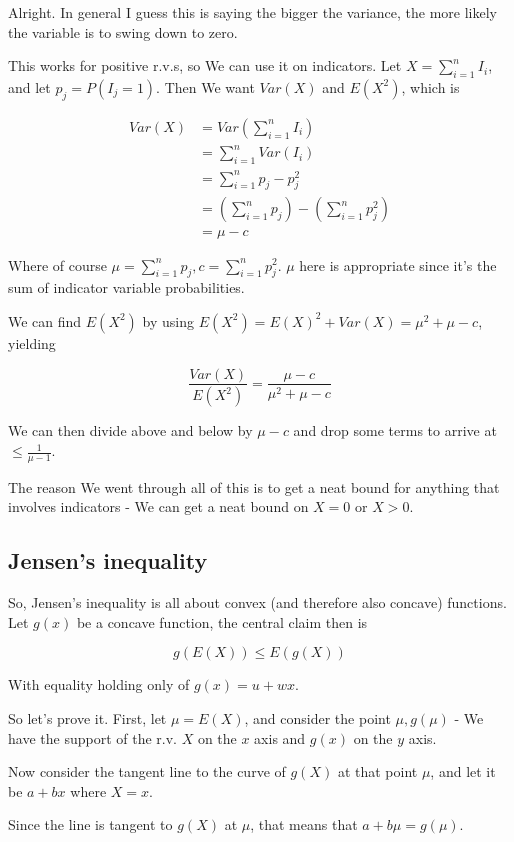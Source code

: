 \documentclass{article}
\begin{document}
		Alright. In general I guess this is saying the bigger the variance, the more likely the variable is to swing down to zero. 
		
		This works for positive r.v.s, so We can use it on indicators. Let $X = \sum^n_{i=1} I_i$, and let $p_j = P(I_j=1)$. Then We want $Var(X)$ and $E(X^2)$, which is
		
		\begin{align*}
		Var(X) &= Var\left(\sum^n_{i=1} I_i \right)\\
		&= \sum^n_{i=1} Var(I_i) \\
		&= \sum^n_{i=1} p_j-p_j^2\\
		&= \left( \sum^n_{i=1}p_j \right) - \left(\sum^n_{i=1} p_j^2 \right)\\
		&= \mu - c
		\end{align*}
		
		Where of course $\mu= \sum^n_{i=1}p_j , c= \sum^n_{i=1} p_j^2$. $\mu$ here is appropriate since it's the sum of indicator variable probabilities. 
		
		We can find $E(X^2)$ by using $E(X^2) = E(X)^2 + Var(X) = \mu^2 + \mu - c$, yielding
		
		\[ \frac{Var(X)}{E(X^2)} = \frac{\mu -c}{\mu^2 + \mu -c} \]
		
		We can then divide above and below by $\mu-c$ and drop some terms to arrive at $\le \frac{1}{\mu-1}$.
		
		The reason We went through all of this is to get a neat bound for anything that involves indicators - We can get a neat bound on $X=0$ or $X>0$.
		
	\subsection{Jensen's inequality}
	
		So, Jensen's inequality is all about convex (and therefore also concave) functions. Let $g(x)$ be a concave function, the central claim then is
		
		\[g(E(X)) \le E(g(X)) \]
		
		With equality holding only of $g(x)= u + wx$. 
		
		So let's prove it. First, let $\mu = E(X)$, and consider the point $\mu, g(\mu)$ - We have the support of the r.v. $X$ on the $x$ axis and $g(x)$ on the $y$ axis. 
		
		Now consider the tangent line to the curve of $g(X)$ at that point $\mu$, and let it be $a+bx$ where $X=x$. 
		
		Since the line is tangent to $g(X)$ at $\mu$, that means that $a+b\mu = g(\mu)$.
		
\end{document}
